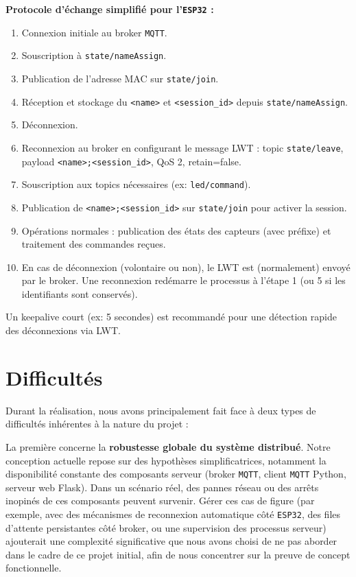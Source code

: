 \documentclass[12pt]{article}
\begin{document}
\textbf{Protocole d'échange simplifié pour l'\texttt{ESP32} :}
\begin{enumerate}
    \item Connexion initiale au broker \texttt{MQTT}.
    \item Souscription à \texttt{state/nameAssign}.
    \item Publication de l'adresse MAC sur \texttt{state/join}.
    \item Réception et stockage du \texttt{<name>} et \texttt{<session\_id>} depuis \texttt{state/nameAssign}.
    \item Déconnexion.
    \item Reconnexion au broker en configurant le message LWT : topic \texttt{state/leave}, payload \texttt{<name>;<session\_id>}, QoS 2, retain=false.
    \item Souscription aux topics nécessaires (ex: \texttt{led/command}).
    \item Publication de \texttt{<name>;<session\_id>} sur \texttt{state/join} pour activer la session.
    \item Opérations normales : publication des états des capteurs (avec préfixe) et traitement des commandes reçues.
    \item En cas de déconnexion (volontaire ou non), le LWT est (normalement) envoyé par le broker. Une reconnexion redémarre le processus à l'étape 1 (ou 5 si les identifiants sont conservés).
\end{enumerate}
Un keepalive court (ex: 5 secondes) est recommandé pour une détection rapide des déconnexions via LWT.

\section{Difficultés}

Durant la réalisation, nous avons principalement fait face à deux types de difficultés inhérentes à la nature du projet :

La première concerne la \textbf{robustesse globale du système distribué}. Notre conception actuelle repose sur des hypothèses simplificatrices, notamment la disponibilité constante des composants serveur (broker \texttt{MQTT}, client \texttt{MQTT} Python, serveur web Flask). Dans un scénario réel, des pannes réseau ou des arrêts inopinés de ces composants peuvent survenir. Gérer ces cas de figure (par exemple, avec des mécanismes de reconnexion automatique côté \texttt{ESP32}, des files d'attente persistantes côté broker, ou une supervision des processus serveur) ajouterait une complexité significative que nous avons choisi de ne pas aborder dans le cadre de ce projet initial, afin de nous concentrer sur la preuve de concept fonctionnelle.
\end{document}
